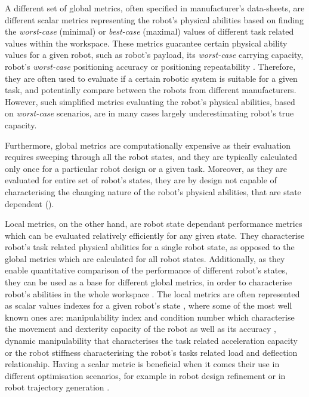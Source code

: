 A different set of global metrics, often specified in manufacturer's data-sheets, are different scalar metrics representing the robot's physical abilities based on finding the \textit{worst-case} (minimal) or \textit{best-case} (maximal) values of different task related values within the workspace. These metrics guarantee certain physical ability values for a given robot, such as robot's payload, its \textit{worst-case} carrying capacity, robot's \textit{worst-case} positioning accuracy or positioning repeatability \cite{russo2022measuring}. 
Therefore, they are often used to evaluate if a certain robotic system is suitable for a given task, and potentially compare between the robots from different manufacturers. However, such simplified metrics evaluating the robot's physical abilities, based on \textit{worst-case} scenarios, are in many cases largely underestimating robot's true capacity.

Furthermore, global metrics are computationally expensive as their evaluation requires sweeping through all the robot states, and they are typically calculated only once for a particular robot design or a given task. Moreover, as they are evaluated for entire set of robot's states, they are by design not capable of characterising the changing nature of the robot's physical abilities, that are state dependent ().

Local metrics, on the other hand, are robot state dependant performance metrics which can be evaluated relatively efficiently for any given state. They characterise robot's task related physical abilities for a single robot state, as opposed to the global metrics which are calculated for all robot states. 
Additionally, as they enable quantitative comparison of the performance of different robot's states, they can be used as a base for different global metrics, in order to characterise robot's abilities in the whole workspace \cite{Zacharias2007}. The local metrics are often represented as scalar values indexes for a given robot's state \cite{Patel2015}, where some of the most well known ones are: manipulability index \cite{yoshikawa1985manipulability} and condition number \cite{Gosselin1991} which characterise the movement and dexterity capacity of the robot as well as its accuracy \cite{merlet_jacobian_2006}, dynamic manipulability \cite{yoshikawa1985dynamic} that characterises the task related acceleration capacity or the robot stiffness \cite{PASHKEVICH2011662} characterising the robot's tasks related load and deflection relationship.
Having a scalar metric is beneficial when it comes their use in different optimisation scenarios, for example in robot design refinement \cite{kucuk2005robot} or in robot trajectory generation \cite{Guilamo2006}. 


